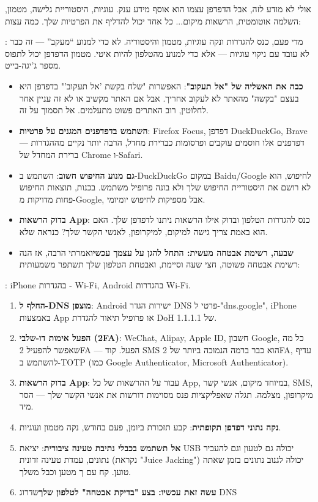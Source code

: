 אולי לא מודע לזה, אבל הדפדפן עצמו הוא אוסף מידע ענק. עוגיות, היסטוריית גלישה, מטמון, השלמה אוטומטית, הרשאות מיקום... כל אחד יכול להדליף את הפרטיות שלך. כמה עצות:


: מדי פעם, כנס להגדרות ונקה עוגיות, מטמון והיסטוריה. לא כדי למנוע “מעקב” — זה כבר לא עובד עם ניקוי עוגיות — אלא כדי למנוע מהטלפון להיות איטי. מטמון הדפדפן יכול לתפוס מספר ג'יגה-בייט.

\begin{itemize}
  \item \textbf{כבה את האשליה של "אל תעקוב"}: האפשרות "שלח בקשת 'אל תעקוב'" בדפדפן היא בעצם "בקשה" מהאתר לא לעקוב אחריך. אבל אם האתר מקשיב או לא זה עניין אחר לחלוטין, רוב האתרים פשוט מתעלמים. אל תסמוך על זה.
  \item \textbf{השתמש בדפדפנים המגנים על פרטיות}: Firefox Focus, דפדפן DuckDuckGo, Brave — דפדפנים אלו חוסמים עוקבים ופרסומות כברירת מחדל, הרבה יותר נקיים מההגדרות ברירת המחדל של Chrome ו-Safari.
  \item \textbf{גם מנוע החיפוש חשוב}: השתמש ב-DuckDuckGo במקום Baidu/Google לחיפוש, הוא לא רושם את היסטוריית החיפוש שלך ולא בונה פרופיל משתמש. בכנות, תוצאות החיפוש פחות מדויקות מ-Google, אבל מספיקות לחיפוש יומיומי.
  \item \textbf{בדוק הרשאות App}: כנס להגדרות הטלפון ובדוק אילו הרשאות ניתנו לדפדפן שלך. האם הוא באמת צריך גישה למיקום, למיקרופון, לאנשי הקשר שלך? כנראה שלא.
  \item \textbf{שבעה, רשימת אבטחה מעשית: התחל להגן על עצמך עכשיו}אמרתי הרבה, אז הנה רשימת אבטחה פשוטה, חצי שעה וסיימת, ואבטחת הטלפון שלך תשתפר משמעותית:
\end{itemize}


: iPhone בהגדרות - Wi-Fi, Android בהגדרות Wi-Fi.

\begin{enumerate}
  \item \textbf{החלף ל-DNS מוצפן}: Android ישירות הגדר DNS פרטי ל-"dns.google", iPhone באמצעות App או פרופיל תיאור להגדרת DoH של 1.1.1.1.
  \item \textbf{הפעל אימות דו-שלבי (2FA)}: WeChat, Alipay, Apple ID, חשבון Google, כל מה שאפשר להפעיל 2FA — הפעל. קוד SMS הוא כבר ברמה הנמוכה ביותר של 2FA, עדיף להשתמש ב-TOTP (כמו Google Authenticator, Microsoft Authenticator).
  \item \textbf{בדוק הרשאות App}: עבור על ההרשאות של כל App, במיוחד מיקום, אנשי קשר, SMS, מיקרופון, מצלמה. תגלה שאפליקציות פנס מסוימות דורשות את אנשי הקשר שלך — הסר מיד.
  \item \textbf{נקה נתוני דפדפן תקופתית}: קבע תזכורת ביומן, פעם בחודש, נקה מטמון ועוגיות.
  \item \textbf{אל תשתמש בכבלי נתיבת טעינה ציבורית}: יציאת USB יכולה גם לטעון וגם להעביר נתונים, עמדת טעינה זדונית (נקראת "Juice Jacking") יכולה לגנוב נתונים בזמן שאתה טוען. קח עם ך מטען וכבל משלך.
  \item \textbf{עשה זאת עכשיו: בצע "בדיקת אבטחה" לטלפון שלך}שדרוג DNS
\end{enumerate}

